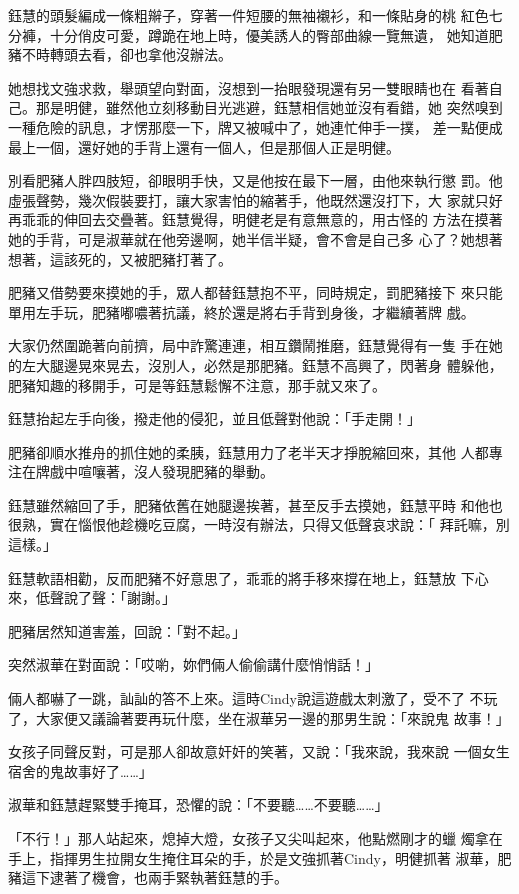 鈺慧的頭髮編成一條粗辮子，穿著一件短腰的無袖襯衫，和一條貼身的桃
紅色七分褲，十分俏皮可愛，蹲跪在地上時，優美誘人的臀部曲線一覽無遺，
她知道肥豬不時轉頭去看，卻也拿他沒辦法。

她想找文強求救，舉頭望向對面，沒想到一抬眼發現還有另一雙眼睛也在
看著自己。那是明健，雖然他立刻移動目光逃避，鈺慧相信她並沒有看錯，她
突然嗅到一種危險的訊息，才愣那麼一下，牌又被喊中了，她連忙伸手一撲，
差一點便成最上一個，還好她的手背上還有一個人，但是那個人正是明健。

別看肥豬人胖四肢短，卻眼明手快，又是他按在最下一層，由他來執行懲
罰。他虛張聲勢，幾次假裝要打，讓大家害怕的縮著手，他既然還沒打下，大
家就只好再乖乖的伸回去交疊著。鈺慧覺得，明健老是有意無意的，用古怪的
方法在摸著她的手背，可是淑華就在他旁邊啊，她半信半疑，會不會是自己多
心了？她想著想著，這該死的，又被肥豬打著了。

肥豬又借勢要來摸她的手，眾人都替鈺慧抱不平，同時規定，罰肥豬接下
來只能單用左手玩，肥豬嘟噥著抗議，終於還是將右手背到身後，才繼續著牌
戲。

大家仍然圍跪著向前擠，局中詐驚連連，相互鑽鬧推磨，鈺慧覺得有一隻
手在她的左大腿邊晃來晃去，沒別人，必然是那肥豬。鈺慧不高興了，閃著身
體躲他，肥豬知趣的移開手，可是等鈺慧鬆懈不注意，那手就又來了。

鈺慧抬起左手向後，撥走他的侵犯，並且低聲對他說：「手走開！」

肥豬卻順水推舟的抓住她的柔胰，鈺慧用力了老半天才掙脫縮回來，其他
人都專注在牌戲中喧嚷著，沒人發現肥豬的舉動。

鈺慧雖然縮回了手，肥豬依舊在她腿邊挨著，甚至反手去摸她，鈺慧平時
和他也很熟，實在惱恨他趁機吃豆腐，一時沒有辦法，只得又低聲哀求說：「
拜託嘛，別這樣。」

鈺慧軟語相勸，反而肥豬不好意思了，乖乖的將手移來撐在地上，鈺慧放
下心來，低聲說了聲：「謝謝。」

肥豬居然知道害羞，回說：「對不起。」

突然淑華在對面說：「哎喲，妳們倆人偷偷講什麼悄悄話！」

倆人都嚇了一跳，訕訕的答不上來。這時Cindy說這遊戲太刺激了，受不了
不玩了，大家便又議論著要再玩什麼，坐在淑華另一邊的那男生說：「來說鬼
故事！」

女孩子同聲反對，可是那人卻故意奸奸的笑著，又說：「我來說，我來說
一個女生宿舍的鬼故事好了……」

淑華和鈺慧趕緊雙手掩耳，恐懼的說：「不要聽……不要聽……」

「不行！」那人站起來，熄掉大燈，女孩子又尖叫起來，他點燃剛才的蠟
燭拿在手上，指揮男生拉開女生掩住耳朵的手，於是文強抓著Cindy，明健抓著
淑華，肥豬這下逮著了機會，也兩手緊執著鈺慧的手。

